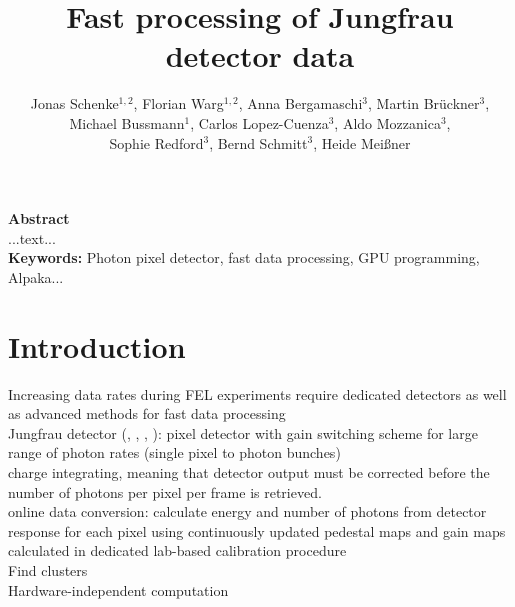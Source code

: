 \documentclass[a4paper]{article}
\begin{document}
\title{Fast processing of Jungfrau detector data}
\author{Jonas Schenke$^{1,2}$, 
Florian Warg$^{1,2}$, 
Anna Bergamaschi$^3$,
Martin Br\"uckner$^3$,\\
Michael Bussmann$^1$,
Carlos Lopez-Cuenza$^3$,
Aldo Mozzanica$^3$,\\
Sophie Redford$^3$,
Bernd Schmitt$^3$,
Heide Mei{\ss}ner}




\date{}

\renewcommand\Affilfont{\itshape}



\maketitle
{\bf Abstract}\\
...text...\\

{\bf Keywords:} Photon pixel detector, fast data processing, GPU programming, Alpaka...



\section{Introduction}

Increasing data rates during FEL experiments require dedicated detectors as well as advanced methods for fast data processing\\

Jungfrau detector (\cite{jungfrau1}, \cite{jungfrau2}, \cite{jungfrau3}, \cite{Mozzanica_2016}): pixel detector with gain switching scheme for large range of photon rates (single pixel to photon bunches)\\

charge integrating, meaning that detector output must be corrected before the number of photons per pixel per frame is retrieved.\\

online data conversion: calculate energy and number of photons from detector response for each pixel using continuously updated pedestal maps and gain maps calculated in dedicated lab-based calibration procedure~\cite{jungfrau2}\\

Find clusters\\

Hardware-independent computation\\
\end{document}
